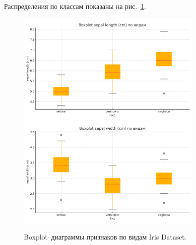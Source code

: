 Распределения по классам показаны на рис.~\ref{fig:iris_boxplots_vertical}.
\begin{figure}[H]
  \centering
  \includegraphics[width=0.8\textwidth]{images/box_sepal_length_cm_cb2.png}\\[6pt]
  \includegraphics[width=0.8\textwidth]{images/box_sepal_width_cm_cb2.png}
  \caption{Boxplot–диаграммы признаков по видам Iris Dataset.}
  \label{fig:iris_boxplots_vertical}
\end{figure}

